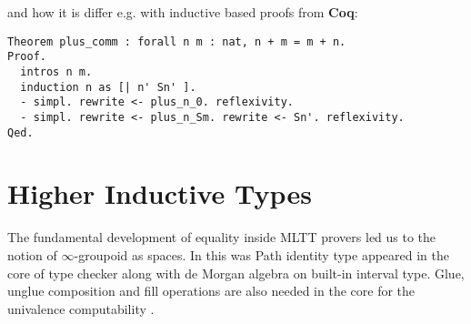 \documentclass{aip-cp}
\begin{document}
and how it is differ e.g. with inductive based proofs from {\bf Coq}:

\begin{lstlisting}[mathescape=true]
Theorem plus_comm : forall n m : nat, n + m = m + n.
Proof.
  intros n m.
  induction n as [| n' Sn' ].
  - simpl. rewrite <- plus_n_0. reflexivity.
  - simpl. rewrite <- plus_n_Sm. rewrite <- Sn'. reflexivity.
Qed.
\end{lstlisting}


\section{Higher Inductive Types}

The fundamental development of equality inside MLTT
provers led us to the notion of $\infty$-groupoid \cite{Streicher95} as spaces.
In this was Path identity type appeared in the core
of type checker along with de Morgan algebra on
built-in interval type. Glue, unglue composition
and fill operations are also needed in the core
for the univalence computability \cite{Mortberg17}.



\end{document}

